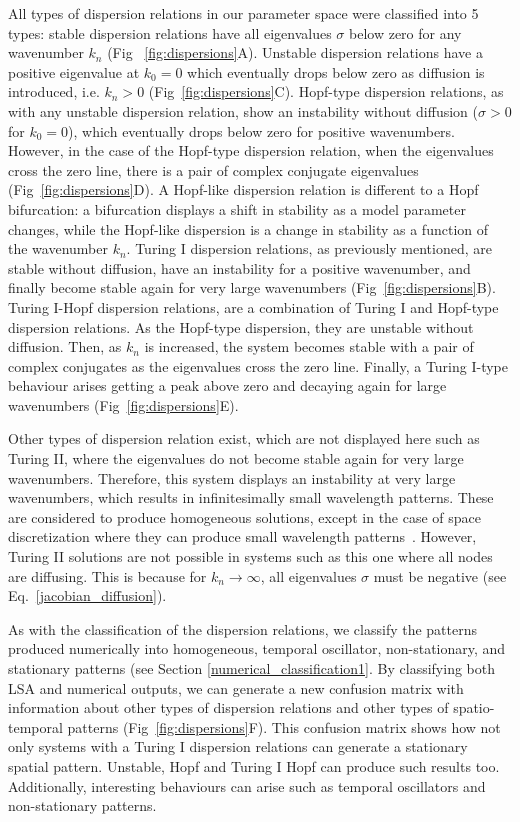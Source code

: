 All types of dispersion relations in our parameter space were classified into 5 types: stable dispersion relations have all eigenvalues $\sigma$ below zero for any wavenumber $k_{n}$ (Fig ~\ref{fig:dispersions}A). Unstable dispersion relations have a positive eigenvalue at $k_{0}=0$ which eventually drops below zero as diffusion is introduced, i.e. $k_{n}>0$ (Fig~\ref{fig:dispersions}C). Hopf-type dispersion relations, as with any unstable dispersion relation, show an instability without diffusion ($\sigma>0$ for $k_{0}=0$), which eventually drops below zero for positive wavenumbers. However, in the case of the Hopf-type dispersion relation, when the eigenvalues cross the zero line, there is a pair of complex conjugate eigenvalues (Fig~\ref{fig:dispersions}D).
A Hopf-like dispersion relation is different to a Hopf bifurcation: a bifurcation displays a shift in stability as a model parameter changes, while the Hopf-like dispersion is a change in stability as a function of the wavenumber $k_{n}$.
Turing I dispersion relations, as previously mentioned, are stable without diffusion, have an instability for a positive wavenumber, and finally become stable again for very large wavenumbers (Fig~\ref{fig:dispersions}B).
Turing I-Hopf dispersion relations, are a combination of Turing I and Hopf-type dispersion relations. As the Hopf-type dispersion, they are unstable without diffusion. Then, as $k_{n}$ is increased, the system becomes stable with a pair of complex conjugates as the eigenvalues cross the zero line.
Finally, a Turing I-type behaviour arises getting a peak above zero and decaying again for large wavenumbers (Fig~\ref{fig:dispersions}E).

Other types of dispersion relation exist, which are not displayed here such as Turing II, where the eigenvalues do not become stable again for very large wavenumbers.
Therefore, this system displays an instability at very large wavenumbers, which results in infinitesimally small wavelength patterns.
These are considered to produce homogeneous solutions, except in the case of space discretization where they can produce small wavelength patterns~\parencite{Wang2022}.
However, Turing II solutions are not possible in systems such as this one where all nodes are diffusing.
This is because for $k_n \rightarrow \infty$, all eigenvalues $\sigma$ must be negative (see Eq.~\ref{jacobian_diffusion}).

As with the classification of the dispersion relations, we classify the patterns produced numerically into homogeneous, temporal oscillator, non-stationary, and stationary patterns (see Section \ref{numerical_classification1}.
By classifying both LSA and numerical outputs, we can generate a new confusion matrix with information about other types of dispersion relations and other types of spatio-temporal patterns (Fig~\ref{fig:dispersions}F). This confusion matrix shows how not only systems with a Turing I dispersion relations can generate a stationary spatial pattern. Unstable, Hopf and Turing I Hopf can produce such results too. Additionally, interesting behaviours can arise such as temporal oscillators and non-stationary patterns.

